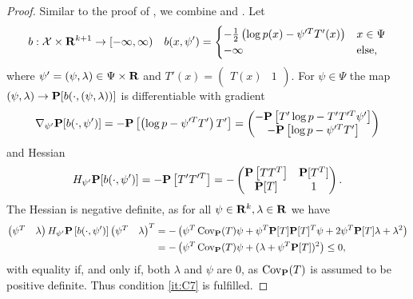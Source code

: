 \begin{proof}
    Similar to the proof of , we combine  and . Let 
    \begin{align*}
        b : \mathcal X \times \R^{k + 1} \to [-\infty, \infty) && b(x, \psi') =  \begin{cases}
            -\frac{1}{2} \left( \log p(x) - \psi^{\prime T}T'(x) \right) & x \in \Psi \\
            -\infty & \text{else,}
        \end{cases}
    \end{align*}
    where $\psi' = (\psi, \lambda) \in \Psi \times\R$ and $T'(x) = \begin{pmatrix} T(x) & 1 \end{pmatrix}$. For $\psi \in \Psi$ the map $(\psi, \lambda) \to \P [b(\cdot, (\psi, \lambda))]$ is differentiable with gradient 
    $$
        \nabla_{\psi'} \P [b(\cdot, \psi')] = - \P \left[\left( \log p - \psi^{\prime T}T' \right) T'\right] = \begin{pmatrix}
            - \P \left[ T'\log p - T'T^{\prime T}\psi' \right] \\
            -\P \left[ \log p - \psi'^{T}T' \right]
        \end{pmatrix}
    $$
    and Hessian 
    $$
        H_{\psi'} \P[b(\cdot, \psi')] = -\P\left[T'T^{\prime T}\right] = - \begin{pmatrix}
            \P \left[ TT^{T} \right] & \P [T^{T}] \\
            \P [T] & 1
        \end{pmatrix}.
    $$
    The Hessian is negative definite, as for all $\psi\in \R^{k}, \lambda \in \R$ we have
    \begin{align*}
        \begin{pmatrix} \psi^{T} & \lambda \end{pmatrix} H_{\psi'} \P \left[ b(\cdot, \psi') \right]\begin{pmatrix} \psi^{T} & \lambda \end{pmatrix}^{T} &= - \left( \psi^{T} \cov_{\P} (T) \psi + \psi^{T}\P[T]\P[T]^{T}\psi + 2 \psi^{T}\P[T] \lambda + \lambda^{2}\right) \\
                                 &= - \left( \psi^{T}\cov_{\P}(T)\psi + (\lambda + \psi^{T}\P[T])^{2} \right) \leq 0,
    \end{align*}
    with equality if, and only if, both $\lambda$ and $\psi$ are $0$, as $\cov_{\P}(T)$ is assumed to be positive definite. Thus condition \ref{it:C7} is fulfilled.


\end{proof}
